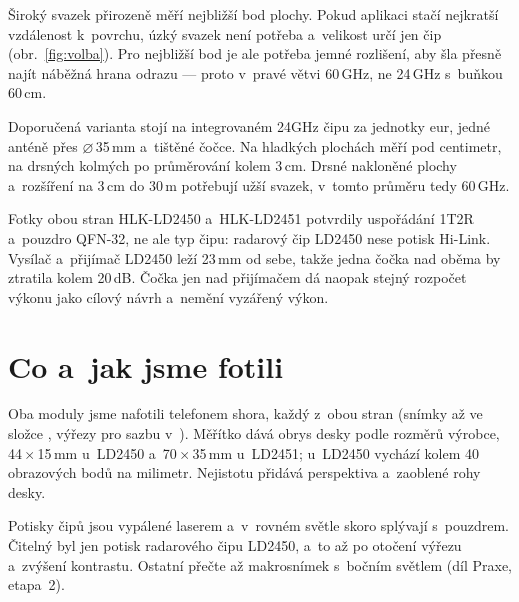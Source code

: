 \documentclass[czech]{skyren}
\begin{document}
Široký svazek přirozeně měří nejbližší bod plochy. Pokud aplikaci stačí
nejkratší vzdálenost k~povrchu, úzký svazek není potřeba a~velikost určí
jen čip (obr.~\ref{fig:volba}). Pro nejbližší bod je ale potřeba jemné
rozlišení, aby šla přesně najít náběžná hrana odrazu --- proto v~pravé
větvi 60\,GHz, ne 24\,GHz s~buňkou 60\,cm.

\begin{skyrentakeaway}
Doporučená varianta stojí na integrovaném 24GHz čipu za jednotky eur, jedné
anténě přes $\varnothing$\,35\,mm a~tištěné čočce. Na hladkých plochách měří
pod centimetr, na drsných kolmých po průměrování kolem 3\,cm. Drsné nakloněné
plochy a~rozšíření na 3\,cm do 30\,m potřebují užší svazek, v~tomto průměru
tedy 60\,GHz.
\end{skyrentakeaway}


\begin{skyrenglance}
Fotky obou stran HLK-LD2450 a~HLK-LD2451 potvrdily uspořádání 1T2R
a~pouzdro QFN-32, ne ale typ čipu: radarový čip LD2450 nese potisk Hi-Link.
Vysílač a~přijímač LD2450 leží 23\,mm od sebe, takže jedna čočka nad oběma
by ztratila kolem 20\,dB. Čočka jen nad přijímačem dá naopak stejný rozpočet
výkonu jako cílový návrh a~nemění vyzářený výkon.
\end{skyrenglance}

\section{Co a~jak jsme fotili}

Oba moduly jsme nafotili telefonem shora, každý z~obou stran (snímky
 až  ve složce ,
výřezy pro sazbu v~). Měřítko dává obrys desky podle
rozměrů výrobce, 44\,$\times$\,15\,mm u~LD2450 a~70\,$\times$\,35\,mm
u~LD2451; u~LD2450 vychází kolem 40 obrazových bodů na milimetr. Nejistotu
přidává perspektiva a~zaoblené rohy desky.

Potisky čipů jsou vypálené laserem a~v~rovném světle skoro splývají
s~pouzdrem. Čitelný byl jen potisk radarového čipu LD2450, a~to až po otočení
výřezu a~zvýšení kontrastu. Ostatní přečte až makrosnímek s~bočním světlem
(díl Praxe, etapa~2).
\end{document}
